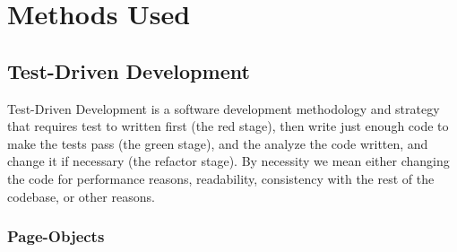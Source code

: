 
\chapter{Methods Used}
\label{Chapter2}

\section{Test-Driven Development}
Test-Driven Development is a software development methodology and strategy that
requires test to written first (the red stage), then write just enough code to
make the tests pass (the green stage), and the analyze the code written, and
change it if necessary (the refactor stage). By necessity we mean either changing
the code for performance reasons, readability, consistency with the rest of the
codebase, or other reasons.
\subsection{Page-Objects}
